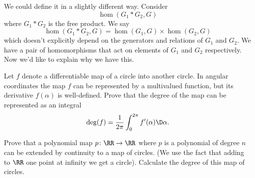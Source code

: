 We could define it in a slightly different way. Consider
\begin{equation*}
\hom(G_1*G_2,G)
\end{equation*}
where $G_1*G_2$ is the free product. We say
\begin{equation}
\hom(G_1*G_2,G)=\hom(G_1,G)\times\hom(G_2,G)
\end{equation}
which doesn't explicitly depend on the generators and relations
of $G_1$ and $G_2$. We have a pair of homomorphisms that act on
elements of $G_1$ and $G_2$ respectively. Now we'd like to
explain why we have this. 



\exercises
\begin{xca}
Let $f$ denote a differentiable map of a circle into another
circle. In angular coordinates the map $f$ can be represented by
a multivalued function, but its derivative $f(\alpha)$ is
well-defined. Prove that the degree of the map can be represented
as an integral 
\begin{equation}
\deg(f)=\frac{1}{2\pi}\int^{2\pi}_{0}f'(\alpha)\D\alpha.
\end{equation}
\end{xca}
\begin{xca}
Prove that a polynomial map $p\colon\RR\to\RR$ where $p$ is a
polynomial of degree $n$ can be extended by continuity to a map
of circles. (We use the fact that adding to $\RR$ one point at
infinity we get a circle). Calculate the degree of this map of
circles. 
\end{xca}
